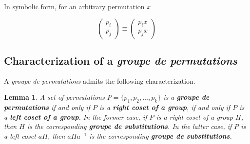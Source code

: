 \documentclass[a4paper,11pt]{article}
\newtheorem{lemma}{Lemma}
\begin{document}
In symbolic form, for an arbitrary permutation \(x\)

\[
\boxed{
	\left(
	\begin{array}{c}
		p_i\\
		p_j
	\end{array}
	\right)
	\equiv
	\left(
	\begin{array}{c}
		p_ix\\
		p_jx
	\end{array}
	\right)
}
\]\subsection{Characterization of a \textit{groupe de permutations}}

A \textit{groupe de permutations} admits the following characterization.

\begin{lemma}
	\label{lem:een}
	A set of permutations \(P=\{p_1,p_2,\dots,p_k\}\) is a \textbf{\textit{groupe de permutations}} if and only if \(P\) is a \textbf{right coset of a group}, if and only if \(P\) is a \textbf{left coset of a group}. In the former case, if \(P\) is a right coset of a group \(H\), then \(H\) is the corresponding \textbf{\textit{groupe de substitutions}}. In the latter case, if \(P\) is a left coset \(aH\), then \(aHa^{-1}\) is the corresponding \textbf{\textit{groupe de substitutions}}.
\end{lemma}
\end{document}
